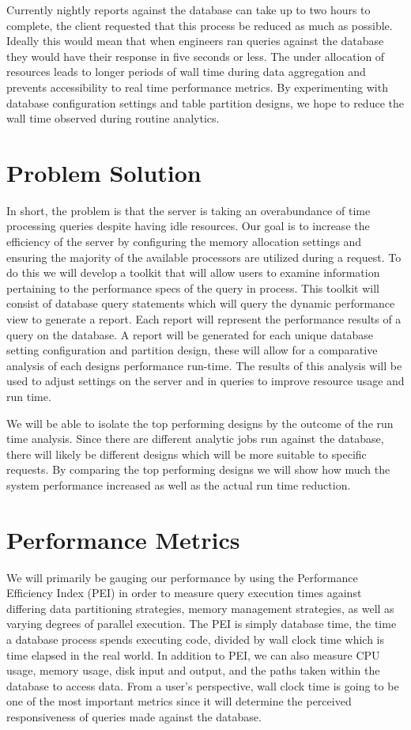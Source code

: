 \documentclass[draftclsnofoot, onecolumn, 10pt]{IEEEtran}
\begin{document}
Currently nightly reports against the database can take up to two hours to complete, the client requested that this process be reduced as much as possible.
Ideally this would mean that when engineers ran queries against the database they would have their response in five seconds or less.
The under allocation of resources leads to longer periods of wall time during data aggregation and prevents accessibility to real time performance metrics.
By experimenting with database configuration settings and table partition designs, we hope to reduce the wall time observed during routine analytics.

\vspace{0.5 in}

\section*{Problem Solution}
In short, the problem is that the server is taking an overabundance of time processing queries despite having idle resources.
Our goal is to increase the efficiency of the server by configuring the memory allocation settings and ensuring the majority of the available processors are utilized during a request.
To do this we will develop a toolkit that will allow users to examine information pertaining to the performance specs of the query in process.
This toolkit will consist of database query statements which will query the dynamic performance view to generate a report.
Each report will represent the performance results of a query on the database.
A report will be generated for each unique database setting configuration and partition design, these will allow for a comparative analysis of each designs performance run-time.
The results of this analysis will be used to adjust settings on the server and in queries to improve resource usage and run time. 


We will be able to isolate the top performing designs by the outcome of the run time analysis.
Since there are different analytic jobs run against the database, there will likely be different designs which will be more suitable to specific requests.
By comparing the top performing designs we will show how much the system performance increased as well as the actual run time reduction.  

\section*{Performance Metrics}
We will primarily be gauging our performance by using the Performance Efficiency Index (PEI) in order to measure query execution times against differing data partitioning strategies, memory management strategies, as well as varying degrees of parallel execution.
The PEI is simply database time, the time a database process spends executing code, divided by wall clock time which is time elapsed in the real world.
In addition to PEI, we can also measure CPU usage, memory usage, disk input and output, and the paths taken within the database to access data.
From a user’s perspective, wall clock time is going to be one of the most important metrics since it will determine the perceived responsiveness of queries made against the database.
\end{document}
